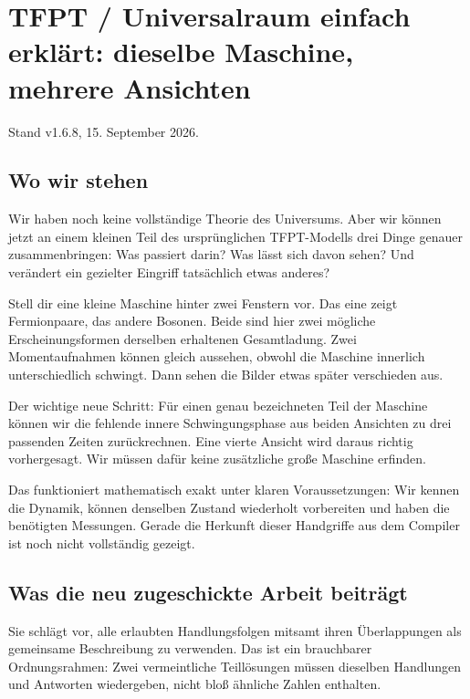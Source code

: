 \documentclass[
  ngerman,
  10pt,
  a4paper,
]{article}
\author{}
\date{}
\begin{document}
\section{TFPT / Universalraum einfach erklärt: dieselbe Maschine,
mehrere
Ansichten}\label{tfpt-universalraum-einfach-erkluxe4rt-dieselbe-maschine-mehrere-ansichten}

Stand v1.6.8, 15. September 2026.

\subsection{Wo wir stehen}\label{wo-wir-stehen}

Wir haben noch keine vollständige Theorie des Universums. Aber wir
können jetzt an einem kleinen Teil des ursprünglichen TFPT-Modells drei
Dinge genauer zusammenbringen: Was passiert darin? Was lässt sich davon
sehen? Und verändert ein gezielter Eingriff tatsächlich etwas anderes?

Stell dir eine kleine Maschine hinter zwei Fenstern vor. Das eine zeigt
Fermionpaare, das andere Bosonen. Beide sind hier zwei mögliche
Erscheinungsformen derselben erhaltenen Gesamtladung. Zwei
Momentaufnahmen können gleich aussehen, obwohl die Maschine innerlich
unterschiedlich schwingt. Dann sehen die Bilder etwas später verschieden
aus.

Der wichtige neue Schritt: Für einen genau bezeichneten Teil der
Maschine können wir die fehlende innere Schwingungsphase aus beiden
Ansichten zu drei passenden Zeiten zurückrechnen. Eine vierte Ansicht
wird daraus richtig vorhergesagt. Wir müssen dafür keine zusätzliche
große Maschine erfinden.

Das funktioniert mathematisch exakt unter klaren Voraussetzungen: Wir
kennen die Dynamik, können denselben Zustand wiederholt vorbereiten und
haben die benötigten Messungen. Gerade die Herkunft dieser Handgriffe
aus dem Compiler ist noch nicht vollständig gezeigt.

\subsection{Was die neu zugeschickte Arbeit
beiträgt}\label{was-die-neu-zugeschickte-arbeit-beitruxe4gt}

Sie schlägt vor, alle erlaubten Handlungsfolgen mitsamt ihren
Überlappungen als gemeinsame Beschreibung zu verwenden. Das ist ein
brauchbarer Ordnungsrahmen: Zwei vermeintliche Teillösungen müssen
dieselben Handlungen und Antworten wiedergeben, nicht bloß ähnliche
Zahlen enthalten.
\end{document}
